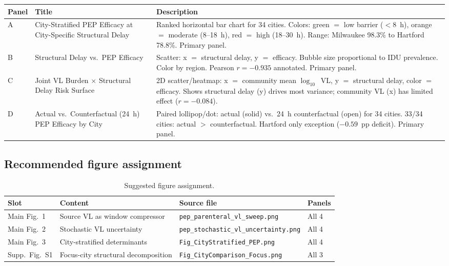 \documentclass[11pt]{article}
\theoremstyle{definition}
\theoremstyle{remark}
\begin{document}
\begin{table}[H]
\centering
\small
\begin{tabular}{@{}lp{4cm}p{8cm}@{}}
\toprule
\textbf{Panel} & \textbf{Title} & \textbf{Description} \\
\midrule
A & City-Stratified PEP Efficacy at City-Specific Structural Delay & Ranked horizontal bar chart for 34 cities. Colors: green $=$ low barrier ($<$8~h), orange $=$ moderate (8--18~h), red $=$ high (18--30~h). Range: Milwaukee 98.3\% to Hartford 78.8\%. Primary panel. \\
B & Structural Delay vs.\ PEP Efficacy & Scatter: x $=$ structural delay, y $=$ efficacy. Bubble size proportional to IDU prevalence. Color by region. Pearson $r = -0.935$ annotated. Primary panel. \\
C & Joint VL Burden $\times$ Structural Delay Risk Surface & 2D scatter/heatmap: x $=$ community mean $\log_{10}$~VL, y $=$ structural delay, color $=$ efficacy. Shows structural delay (y) drives most variance; community VL (x) has limited effect ($r = -0.084$). \\
D & Actual vs.\ Counterfactual (24~h) PEP Efficacy by City & Paired lollipop/dot: actual (solid) vs.\ 24~h counterfactual (open) for 34 cities. 33/34 cities: actual $>$ counterfactual. Hartford only exception ($-0.59$~pp deficit). Primary panel. \\
\bottomrule
\end{tabular}
\end{table}

\subsection{Recommended figure assignment}

\begin{table}[H]
\centering
\small
\caption{Suggested figure assignment.}
\begin{tabular}{@{}llll@{}}
\toprule
\textbf{Slot} & \textbf{Content} & \textbf{Source file} & \textbf{Panels} \\
\midrule
Main Fig.~1 & Source VL as window compressor & \texttt{pep\_parenteral\_vl\_sweep.png} & All 4 \\
Main Fig.~2 & Stochastic VL uncertainty & \texttt{pep\_stochastic\_vl\_uncertainty.png} & All 4 \\
Main Fig.~3 & City-stratified determinants & \texttt{Fig\_CityStratified\_PEP.png} & All 4 \\
Supp.\ Fig.\ S1 & Focus-city structural decomposition & \texttt{Fig\_CityComparison\_Focus.png} & All 3 \\
\bottomrule
\end{tabular}
\end{table}
\end{document}
